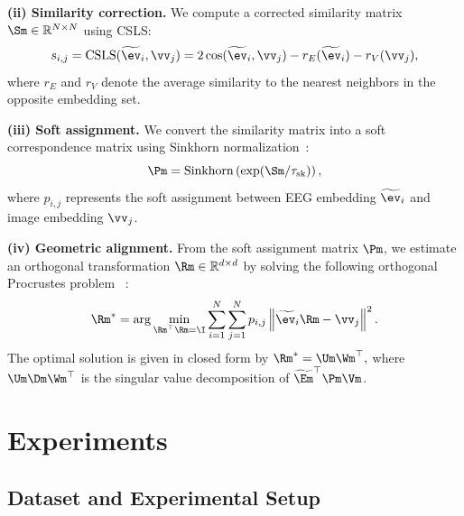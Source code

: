 \documentclass{article}
\begin{document}
\textbf{(ii) Similarity correction.}
We compute a corrected similarity matrix $\Sm \in \mathbb{R}^{N\times N}$ using CSLS:
\begin{equation}
s_{i,j}
=
\mathrm{CSLS}(\widetilde{\ev}_i,\vv_j)
=
2\cos(\widetilde{\ev}_i,\vv_j)
-
r_E(\widetilde{\ev}_i)
-
r_V(\vv_j),
\end{equation}
where $r_E$ and $r_V$ denote the average similarity to the nearest neighbors in the opposite embedding set.

\textbf{(iii) Soft assignment.}
We convert the similarity matrix into a soft correspondence matrix using Sinkhorn normalization~\cite{sinkhorn1964,cuturi2013sinkhorn}:
\begin{equation}
\Pm = \mathrm{Sinkhorn}\left(\exp(\Sm/\tau_{\mathrm{sk}})\right),
\end{equation}
where $p_{i,j}$ represents the soft assignment between EEG embedding $\widetilde{\ev}_i$ and image embedding $\vv_j$.

\textbf{(iv) Geometric alignment.}
From the soft assignment matrix $\Pm$, we estimate an orthogonal transformation $\Rm \in \mathbb{R}^{d\times d}$ by solving the following orthogonal Procrustes problem~\cite{schonemann1966procrustes} : 
\begin{equation}
\Rm^*
=
\arg\min_{\Rm^\top \Rm = \I}
\sum_{i=1}^{N}\sum_{j=1}^{N}
p_{i,j}\left\|\widetilde{\ev}_i\Rm - \vv_j\right\|^2 .
\end{equation}
The optimal solution is given in closed form by $\Rm^* = \Um \Wm^\top,$ where $\Um \Dm \Wm^\top$ is the singular value decomposition of $\widetilde{\Em}^\top \Pm \Vm$.
 

\section{Experiments}
\label{sec:experiments}

\subsection{Dataset and Experimental Setup}
\label{sec:dataset}
\end{document}
